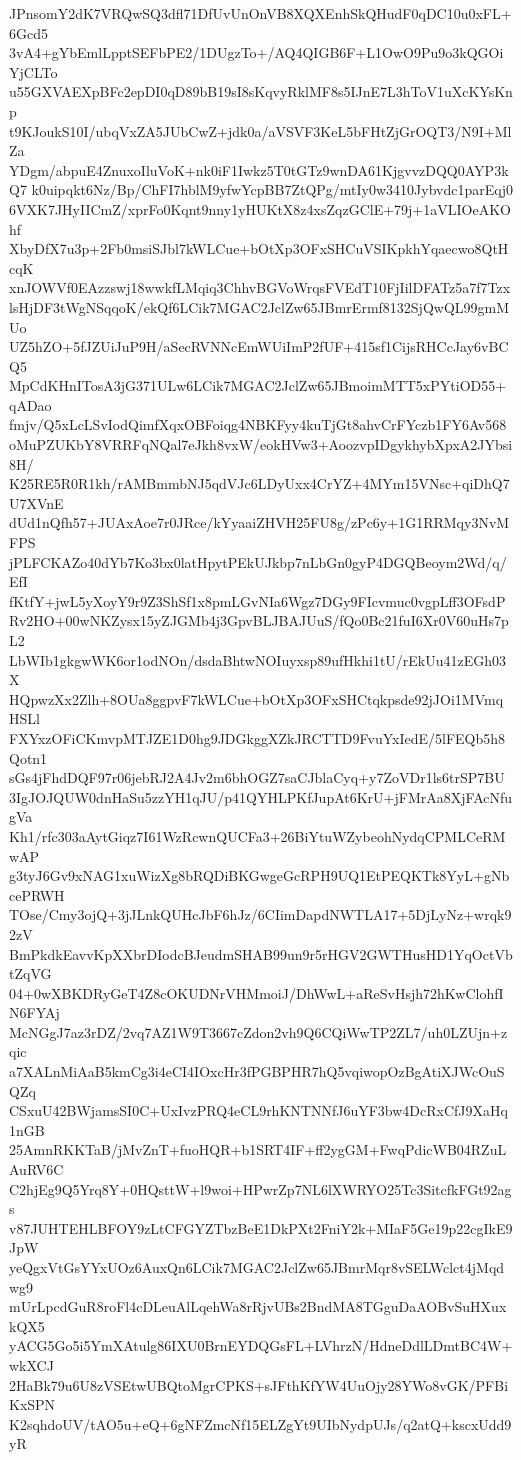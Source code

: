 JPnsomY2dK7VRQwSQ3dfl71DfUvUnOnVB8XQXEnhSkQHudF0qDC10u0xFL+6Gcd5
3vA4+gYbEmlLpptSEFbPE2/1DUgzTo+/AQ4QIGB6F+L1OwO9Pu9o3kQGOiYjCLTo
u55GXVAEXpBFc2epDI0qD89bB19sI8sKqvyRklMF8s5IJnE7L3hToV1uXcKYsKnp
t9KJoukS10I/ubqVxZA5JUbCwZ+jdk0a/aVSVF3KeL5bFHtZjGrOQT3/N9I+MlZa
YDgm/abpuE4ZnuxoIluVoK+nk0iF1Iwkz5T0tGTz9wnDA61KjgvvzDQQ0AYP3kQ7
k0uipqkt6Nz/Bp/ChFI7hblM9yfwYcpBB7ZtQPg/mtIy0w3410Jybvdc1parEqj0
6VXK7JHyIICmZ/xprFo0Kqnt9nny1yHUKtX8z4xsZqzGClE+79j+1aVLIOeAKOhf
XbyDfX7u3p+2Fb0msiSJbl7kWLCue+bOtXp3OFxSHCuVSIKpkhYqaecwo8QtHcqK
xnJOWVf0EAzzswj18wwkfLMqiq3ChhvBGVoWrqsFVEdT10FjIilDFATz5a7f7Tzx
lsHjDF3tWgNSqqoK/ekQf6LCik7MGAC2JclZw65JBmrErmf8132SjQwQL99gmMUo
UZ5hZO+5fJZUiJuP9H/aSecRVNNcEmWUiImP2fUF+415sf1CijsRHCcJay6vBCQ5
MpCdKHnITosA3jG371ULw6LCik7MGAC2JclZw65JBmoimMTT5xPYtiOD55+qADao
fmjv/Q5xLcLSvIodQimfXqxOBFoiqg4NBKFyy4kuTjGt8ahvCrFYczb1FY6Av568
oMuPZUKbY8VRRFqNQal7eJkh8vxW/eokHVw3+AoozvpIDgykhybXpxA2JYbsi8H/
K25RE5R0R1kh/rAMBmmbNJ5qdVJc6LDyUxx4CrYZ+4MYm15VNsc+qiDhQ7U7XVnE
dUd1nQfh57+JUAxAoe7r0JRce/kYyaaiZHVH25FU8g/zPc6y+1G1RRMqy3NvMFPS
jPLFCKAZo40dYb7Ko3bx0latHpytPEkUJkbp7nLbGn0gyP4DGQBeoym2Wd/q/EfI
fKtfY+jwL5yXoyY9r9Z3ShSf1x8pmLGvNIa6Wgz7DGy9FIcvmuc0vgpLff3OFsdP
Rv2HO+00wNKZysx15yZJGMb4j3GpvBLJBAJUuS/fQo0Bc21fuI6Xr0V60uHs7pL2
LbWIb1gkgwWK6or1odNOn/dsdaBhtwNOIuyxsp89ufHkhi1tU/rEkUu41zEGh03X
HQpwzXx2Zlh+8OUa8ggpvF7kWLCue+bOtXp3OFxSHCtqkpsde92jJOi1MVmqHSLl
FXYxzOFiCKmvpMTJZE1D0hg9JDGkggXZkJRCTTD9FvuYxIedE/5lFEQb5h8Qotn1
sGs4jFhdDQF97r06jebRJ2A4Jv2m6bhOGZ7saCJblaCyq+y7ZoVDr1ls6trSP7BU
3IgJOJQUW0dnHaSu5zzYH1qJU/p41QYHLPKfJupAt6KrU+jFMrAa8XjFAcNfugVa
Kh1/rfc303aAytGiqz7I61WzRcwnQUCFa3+26BiYtuWZybeohNydqCPMLCeRMwAP
g3tyJ6Gv9xNAG1xuWizXg8bRQDiBKGwgeGcRPH9UQ1EtPEQKTk8YyL+gNbcePRWH
TOse/Cmy3ojQ+3jJLnkQUHcJbF6hJz/6CIimDapdNWTLA17+5DjLyNz+wrqk92zV
BmPkdkEavvKpXXbrDIodcBJeudmSHAB99un9r5rHGV2GWTHusHD1YqOctVbtZqVG
04+0wXBKDRyGeT4Z8cOKUDNrVHMmoiJ/DhWwL+aReSvHsjh72hKwClohfIN6FYAj
McNGgJ7az3rDZ/2vq7AZ1W9T3667cZdon2vh9Q6CQiWwTP2ZL7/uh0LZUjn+zqic
a7XALnMiAaB5kmCg3i4eCI4IOxcHr3fPGBPHR7hQ5vqiwopOzBgAtiXJWcOuSQZq
CSxuU42BWjamsSI0C+UxIvzPRQ4eCL9rhKNTNNfJ6uYF3bw4DcRxCfJ9XaHq1nGB
25AmnRKKTaB/jMvZnT+fuoHQR+b1SRT4IF+ff2ygGM+FwqPdicWB04RZuLAuRV6C
C2hjEg9Q5Yrq8Y+0HQsttW+l9woi+HPwrZp7NL6lXWRYO25Tc3SitcfkFGt92ags
v87JUHTEHLBFOY9zLtCFGYZTbzBeE1DkPXt2FniY2k+MIaF5Ge19p22cgIkE9JpW
yeQgxVtGsYYxUOz6AuxQn6LCik7MGAC2JclZw65JBmrMqr8vSELWclct4jMqdwg9
mUrLpcdGuR8roFl4cDLeuAlLqehWa8rRjvUBs2BndMA8TGguDaAOBvSuHXuxkQX5
yACG5Go5i5YmXAtulg86IXU0BrnEYDQGsFL+LVhrzN/HdneDdlLDmtBC4W+wkXCJ
2HaBk79u6U8zVSEtwUBQtoMgrCPKS+sJFthKfYW4UuOjy28YWo8vGK/PFBiKxSPN
K2sqhdoUV/tAO5u+eQ+6gNFZmcNf15ELZgYt9UIbNydpUJs/q2atQ+kscxUdd9yR
